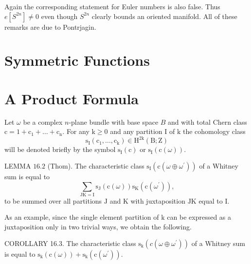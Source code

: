 \documentclass[10pt]{article}
\begin{document}
Again the corresponding statement for Euler numbers is also false. Thus $e\left[S^{2 n}\right] \neq 0$ even though $S^{2 n}$ clearly bounds an oriented manifold. All of these remarks are due to Pontrjagin.

\section{Symmetric Functions}

\section{A Product Formula}
Let $\omega$ be a complex $n$-plane bundle with base space $B$ and with total Chern class $\mathrm{c}=1+\mathrm{c}_{1}+\ldots+\mathrm{c}_{\mathrm{n}}$. For any $\mathrm{k} \geq 0$ and any partition I of $\mathrm{k}$ the cohomology class
$$
\mathrm{s}_{\mathrm{I}}\left(\mathrm{c}_{1}, \ldots, \mathrm{c}_{\mathrm{k}}\right) \in \mathrm{H}^{2 \mathrm{k}}(\mathrm{B} ; \mathrm{Z})
$$
will be denoted briefly by the symbol $\mathrm{s}_{\mathrm{I}}(\mathrm{c})$ or $\mathrm{s}_{\mathrm{I}}(\mathrm{c}(\omega))$.

LEMMA $16.2$ (Thom). The characteristic class $\mathrm{s}_{\mathrm{I}}\left(\mathrm{c}\left(\omega \oplus \omega^{\prime}\right)\right)$ of a Whitney sum is equal to
$$
\sum_{\mathrm{JK}=\mathrm{I}} \mathrm{s}_{\mathrm{J}}(\mathrm{c}(\omega)) \mathrm{s}_{\mathrm{K}}\left(\mathrm{c}\left(\omega^{\prime}\right)\right),
$$
to be summed over all partitions $\mathrm{J}$ and $\mathrm{K}$ with juxtaposition $\mathrm{JK}$ equal to $\mathrm{I}$.

As an example, since the single element partition of $\mathrm{k}$ can be expressed as a juxtaposition only in two trivial ways, we obtain the following.

COROLLARY 16.3. The characteristic class $\mathrm{s}_{\mathrm{k}}\left(c\left(\omega \oplus \omega^{\prime}\right)\right)$ of a Whitney sum is equal to $\mathrm{s}_{\mathrm{k}}(\mathrm{c}(\omega))+\mathrm{s}_{\mathrm{k}}\left(\mathrm{c}\left(\omega^{\prime}\right)\right)$.
\end{document}

